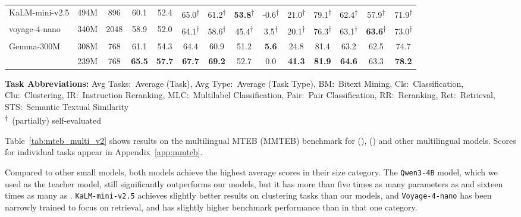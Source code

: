 \documentclass[11pt]{article}
\begin{document}
\begin{table}[t]
\begin{tabular}{@{}lccccccccccccc@{}}
\midrule
KaLM-mini-v2.5                   & 494M  & 896  & 60.1 & 52.4 & 65.0\textsuperscript{†} & 61.2\textsuperscript{†} & \textbf{53.8}\textsuperscript{†} & -0.6\textsuperscript{†} & 21.0\textsuperscript{†} & 79.1\textsuperscript{†} & 62.4\textsuperscript{†} & 57.9\textsuperscript{†} & 71.9\textsuperscript{†} \\
voyage-4-nano                    & 340M  & 2048 & 58.9 & 52.0 & 64.1\textsuperscript{†} & 58.6\textsuperscript{†} & 45.4\textsuperscript{†} & 3.5\textsuperscript{†}  & 20.1\textsuperscript{†} & 76.3\textsuperscript{†} & 63.1\textsuperscript{†} & \textbf{63.6}\textsuperscript{†} & 73.0\textsuperscript{†} \\
Gemma-300M                       & 308M  & 768  & 61.1 & 54.3 & 64.4 & 60.9 & 51.2 & \textbf{5.6} & 24.8 & 81.4 & 63.2 & 62.5 & 74.7 \\
\JEmbeddingVFiveTextNanoShort{}  & 239M  & 768  & \textbf{65.5} & \textbf{57.7} & \textbf{67.7} & \textbf{69.2} & 52.7 & 0.0 & \textbf{41.3} & \textbf{81.9} & \textbf{64.6} & 63.3 & \textbf{78.2} \\
\bottomrule
\end{tabular}

\medskip
\begin{flushleft}
\textbf{Task Abbreviations:}
Avg Tasks:~Average (Task),
Avg Type:~Average (Task Type),
BM:~Bitext Mining,
Cls:~Classification,
Clu:~Clustering,
IR:~Instruction Reranking,
MLC:~Multilabel Classification,
Pair:~Pair Classification,
RR:~Reranking,
Ret:~Retrieval,
STS:~Semantic Textual Similarity \\
\textsuperscript{†}~(partially) self-evaluated
\end{flushleft}
\end{table}

Table~\ref{tab:mteb_multi_v2} shows results on the multilingual MTEB (MMTEB) benchmark for \JEmbeddingVFiveTextSmall{} (\JEmbeddingVFiveTextSmallShort{}), \JEmbeddingVFiveTextNano{} (\JEmbeddingVFiveTextNanoShort{}) and other multilingual models.
Scores for individual tasks appear in Appendix~\ref{app:mmteb}.

Compared to other small models, both \JEmbeddingVFiveText{} models achieve the highest average scores in their size category.
The \texttt{Qwen3-4B} model, which we used as the teacher model, still significantly outperforms our models, but it has more than five times as many parameters as \JEmbeddingVFiveTextSmall{} and sixteen times as many as \JEmbeddingVFiveTextNano{}.
\texttt{KaLM-mini-v2.5} achieves slightly better results on clustering tasks than our models, and
\texttt{Voyage-4-nano} has been narrowly trained to focus on retrieval, and has slightly higher benchmark performance than \JEmbeddingVFiveTextNano{}{} in that one category.
\end{document}
